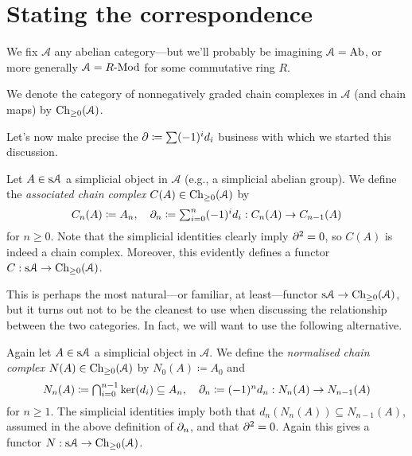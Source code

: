 
\renewcommand{\A}{\mathcal{A}}

\section{Stating the correspondence}

We fix $\A$ any abelian category---but we'll probably be imagining $\A
= \Ab$, or more generally $\A = R\text{-}\Mod$ for some commutative
ring $R$.

\begin{notation}
  We denote the category of nonnegatively graded chain complexes in
  $\A$ (and chain maps) by $\Ch_{\ge 0}(\A)$.
\end{notation}

Let's now make precise the $\partial \coloneqq \sum (-1)^i d_i$ business
with which we started this discussion.

\begin{definition}
  Let $A \in \s\A$ a simplicial object in $\A$ (e.g., a simplicial
  abelian group). We define the \textit{associated chain complex}
  $C(A) \in \Ch_{\ge 0}(\A)$ by
  \[
  \textstyle{C_n(A) \coloneqq A_n, \quad \partial_n \coloneqq \sum_{i=0}^n
    (-1)^i d_i : C_n(A) \to C_{n-1}(A)}
  \]
  for $n \ge 0$. Note that the simplicial identities clearly imply
  $\partial^2 = 0$, so $C(A)$ is indeed a chain complex. Moreover, this
  evidently defines a functor $C : \s\A \to \Ch_{\ge 0}(\A)$.
\end{definition}

This is perhaps the most natural---or familiar, at least---functor
$\s\A \to \Ch_{\ge 0}(\A)$, but it turns out not to be the cleanest to
use when discussing the relationship between the two categories. In
fact, we will want to use the following alternative.

\begin{definition}
  Again let $A \in \s\A$ a simplicial object in $\A$. We define the
  \textit{normalised chain complex} $N(A) \in \Ch_{\ge 0}(\A)$ by
  $N_0(A) \coloneqq A_0$ and
  \[
  \textstyle{N_n(A) \coloneqq
    \bigcap_{i=0}^{n-1} \ker(d_i) \subseteq A_n, \quad \partial_n
    \coloneqq (-1)^n d_n : N_n(A) \to N_{n-1}(A)}
  \]
  for $n \ge 1$. The simplicial identities imply both that
  $d_n(N_n(A)) \subseteq N_{n-1}(A)$, assumed in the above definition
  of $\partial_n$, and that $\partial^2 = 0$. Again this gives a functor $N :
  \s\A \to \Ch_{\ge 0}(\A)$.
\end{definition}

